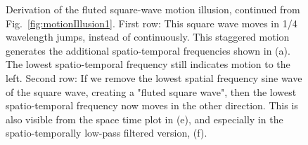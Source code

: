 \begin{figure}
{\hspace{-0.2in}
\hspace{-0.4in}
}
\caption{Derivation of the fluted square-wave motion illusion, continued from Fig.~\ref{fig:motionIllusion1}.  First row:  This square wave moves in 1/4 wavelength jumps, instead of continuously.  This staggered motion generates the additional spatio-temporal frequencies shown in (a).  The lowest spatio-temporal frequency still indicates motion to the left.  Second row:  If we remove the lowest spatial frequency sine wave of the square wave, creating a "fluted square wave", then the lowest spatio-temporal frequency now moves in the other direction.  This is also visible from the space time plot in (e), and especially in the spatio-temporally low-pass filtered version, (f).}
\label{fig:motionIllusion2}
\end{figure}




